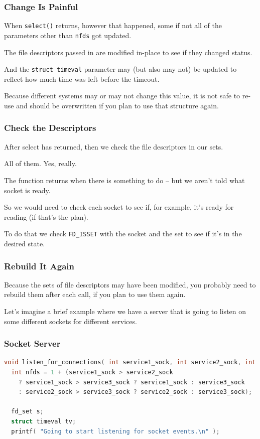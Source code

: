 \begin{frame}
\frametitle{Change Is Painful}

When \texttt{select()} returns, however that happened, some if not all of the parameters other than \texttt{nfds} got updated. 

The file descriptors passed in are modified in-place to see if they changed status.  

And the \texttt{struct timeval} parameter may (but also may not) be updated to reflect how much time was left before the timeout. 

Because different systems may or may not change this value, it is not safe to re-use and should be overwritten if you plan to use that structure again.

\end{frame}


\begin{frame}
\frametitle{Check the Descriptors}

After select has returned, then we check the file descriptors in our sets. 

All of them. Yes, really.

 The function returns when there is something to do -- but we aren't told what socket is ready. 
 
 So we would need to check each socket to see if, for example, it's ready for reading (if that's the plan). 
 
 To do that we check \texttt{FD\_ISSET} with the socket and the set to see if it's in the desired state.

\end{frame}

\begin{frame}
\frametitle{Rebuild It Again}

Because the sets of file descriptors may have been modified, you probably need to rebuild them after each call, if you plan to use them again. 

Let's imagine a brief example where we have a server that is going to listen on some different sockets for different services.

\end{frame}


\begin{frame}[fragile]
\frametitle{Socket Server}

\begin{lstlisting}[language=C]
void listen_for_connections( int service1_sock, int service2_sock, int service3_sock ) {
  int nfds = 1 + (service1_sock > service2_sock
    ? service1_sock > service3_sock ? service1_sock : service3_sock
    : service2_sock > service3_sock ? service2_sock : service3_sock);
    
  fd_set s;
  struct timeval tv;
  printf( "Going to start listening for socket events.\n" );
\end{lstlisting}

\end{frame}

